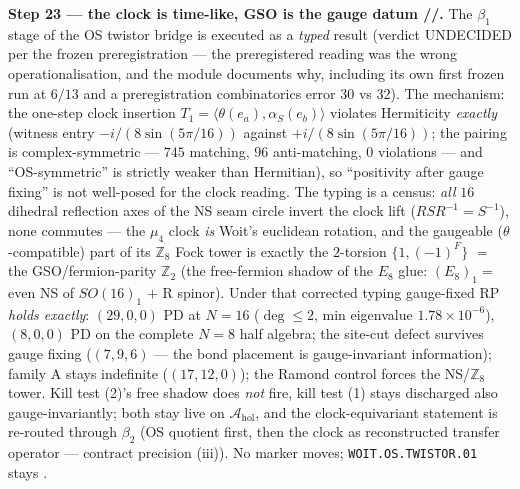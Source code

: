 \documentclass[11pt,a4paper]{article}
\newcommand{\Z}{\mathbb{Z}}
\theoremstyle{definition}
\begin{document}
\par\smallskip\noindent\textbf{Step 23 --- the clock is time-like, GSO is the gauge datum
\mE/\mC/\mO.} The $\beta_1$ stage of the OS twistor bridge is executed as a \emph{typed} result
(verdict UNDECIDED per the frozen preregistration --- the preregistered reading was the wrong
operationalisation, and the module documents why, including its own first frozen run at $6/13$
and a preregistration combinatorics error $30$ vs $32$). The mechanism: the one-step clock
insertion $T_1=\langle\theta(e_a),\alpha_S(e_b)\rangle$ violates Hermiticity \emph{exactly}
(witness entry $-i/(8\sin(5\pi/16))$ against $+i/(8\sin(5\pi/16))$; the pairing is
complex-symmetric --- $745$ matching, $96$ anti-matching, $0$ violations --- and
``OS-symmetric'' is strictly weaker than Hermitian), so ``positivity after gauge fixing'' is
not well-posed for the clock reading. The typing is a census: \emph{all} $16$ dihedral
reflection axes of the NS seam circle invert the clock lift ($RSR^{-1}=S^{-1}$), none commutes
--- the $\mu_4$ clock \emph{is} Woit's euclidean rotation, and the gaugeable
($\theta$-compatible) part of its $\Z_8$ Fock tower is exactly the $2$-torsion
$\{1,(-1)^F\}$ $=$ the GSO/fermion-parity $\Z_2$ (the free-fermion shadow of the $E_8$ glue:
$(E_8)_1=$ even NS of $SO(16)_1$ $+$ R spinor). Under that corrected typing gauge-fixed RP
\emph{holds exactly}: $(29,0,0)$ PD at $N=16$ ($\deg\le2$, min eigenvalue $1.78\times10^{-6}$),
$(8,0,0)$ PD on the complete $N=8$ half algebra; the site-cut defect survives gauge fixing
($(7,9,6)$ --- the bond placement is gauge-invariant information); family A stays indefinite
($(17,12,0)$); the Ramond control forces the NS/$\Z_8$ tower. Kill test (2)'s free shadow does
\emph{not} fire, kill test (1) stays discharged also gauge-invariantly; both stay live on
$\mathcal A_{\mathrm{hol}}$, and the clock-equivariant statement is re-routed through $\beta_2$
(OS quotient first, then the clock as reconstructed transfer operator --- contract precision
(iii)). No marker moves; \texttt{WOIT.OS.TWISTOR.01} stays \mO.
\end{document}
